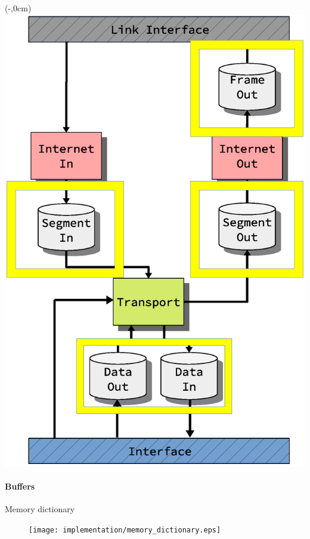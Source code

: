 \begin{frame}[fragile]
    \begin{textblock*}{\displayThumbnail}(\paperwidth-\displayThumbnail-0.2cm,0cm) %
        \colorbox{white}{\includegraphics[width=\textwidth]{implementation/design_2_memory.eps}}
    \end{textblock*}
    \frametitle{\ImplementationTitle}
    \framesubtitle{Buffers}
    Memory dictionary\\
    \begin{minipage}[t]{1\textwidth}
        \begin{figure}
                \centering
                \texttt{[image: implementation/memory\_dictionary.eps]}
        \end{figure}
    \end{minipage}
\end{frame}

